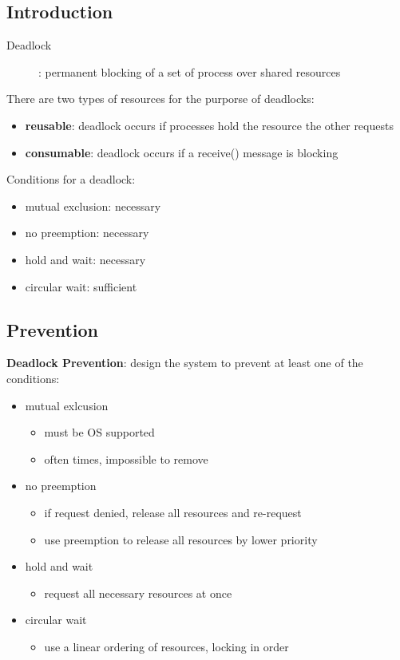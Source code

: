 \documentclass[]{article}
\theoremstyle{definition}
\begin{document}
	\subsection{Introduction}
	\begin{description}
		\item[Deadlock]: permanent blocking of a set of process over shared resources
	\end{description}
	There are two types of resources for the purporse of deadlocks:
	\begin{itemize}
		\item \textbf{reusable}: deadlock occurs if processes hold the resource the other requests
		\item \textbf{consumable}: deadlock occurs if a receive() message is blocking
	\end{itemize}
	Conditions for a deadlock:
	\begin{itemize}
		\item mutual exclusion: necessary
		\item no preemption: necessary
		\item hold and wait: necessary
		\item circular wait: sufficient
	\end{itemize}

	\subsection{Prevention}
	\textbf{Deadlock Prevention}: design the system to prevent at least one of the conditions:
	\begin{itemize}
		\item mutual exlcusion
			\begin{itemize}
				\item must be OS supported
				\item often times, impossible to remove
			\end{itemize}
		\item no preemption
			\begin{itemize}
				\item if request denied, release all resources and re-request
				\item use preemption to release all resources by lower priority
			\end{itemize}
		\item hold and wait
			\begin{itemize}
				\item request all necessary resources at once
			\end{itemize}
		\item circular wait
			\begin{itemize}
				\item use a linear ordering of resources, locking in order
			\end{itemize}
	\end{itemize}
\end{document}
